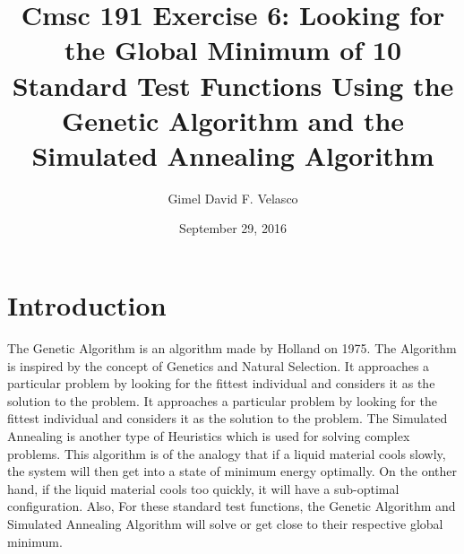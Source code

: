 \documentclass{article}
\begin{document}
\title{Cmsc 191 Exercise 6: Looking for the Global Minimum of 10 Standard Test Functions Using the Genetic Algorithm and the Simulated Annealing Algorithm}

\author{Gimel David F. Velasco}

\date{September 29, 2016}

\maketitle


\section{Introduction}
The Genetic Algorithm is an algorithm made by Holland on 1975. The Algorithm is inspired by the concept of Genetics and Natural Selection. It approaches a particular problem by looking for the fittest individual and considers it as the solution to the problem. It approaches a particular problem by looking for the fittest individual and considers it as the solution to the problem. The Simulated Annealing is another type of Heuristics which is used for solving complex problems. This algorithm is of the analogy that if a liquid material cools slowly, the system will then get into a state of minimum energy optimally. On the onther hand, if the liquid material cools too quickly, it will have a sub-optimal configuration. Also, For these standard test functions, the Genetic Algorithm and Simulated Annealing Algorithm will solve or get close to their respective global minimum.
\end{document}
